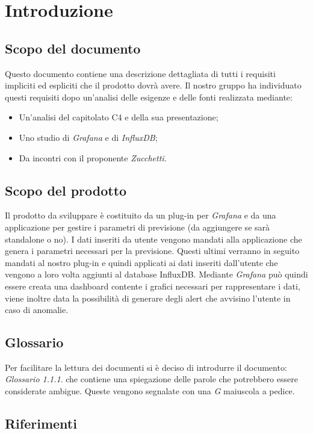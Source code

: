 \documentclass[a4]{article}
\begin{document}
	\section{Introduzione}
		\subsection{Scopo del documento}
			Questo documento contiene una descrizione dettagliata di tutti i requisiti impliciti ed espliciti che il prodotto dovrà avere. Il nostro gruppo ha individuato questi requisiti dopo un'analisi delle esigenze e delle fonti realizzata mediante: 
				\begin{itemize}
					\item Un'analisi del capitolato C4 e della sua presentazione; 
					\item Uno studio di \textit{Grafana} e di \textit{InfluxDB};
					\item Da incontri con il proponente \textit{Zucchetti}.
				\end{itemize}
		\subsection{Scopo del prodotto}
			Il prodotto da sviluppare è costituito da un plug-in per \textit{Grafana} e da una applicazione per gestire i parametri di previsione (da aggiungere se sarà standalone o no). I dati inseriti da utente vengono mandati alla applicazione che genera i parametri necessari per la previsione. Questi ultimi verranno in seguito mandati al nostro plug-in e quindi applicati ai dati inseriti dall'utente che vengono a loro volta aggiunti al database InfluxDB. Mediante \textit{Grafana} può quindi essere creata una dashboard contente i grafici necessari per rappresentare i dati, viene inoltre data la possibilità di generare degli alert che avvisino l'utente in caso di anomalie.
		
		\subsection{Glossario}
			Per facilitare la lettura dei documenti si è deciso di introdurre il documento: \textit{Glossario 1.1.1}. che contiene una spiegazione delle parole che potrebbero essere considerate ambigue. Queste vengono segnalate con una \textit{G} maiuscola a pedice.  
		\subsection{Riferimenti}
\end{document}
